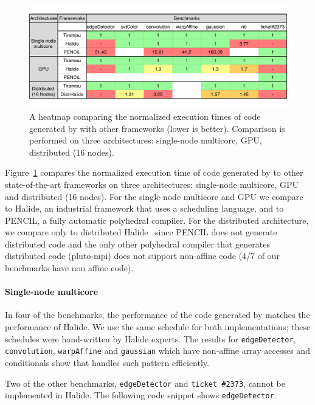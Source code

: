 \begin{figure}[t]
\centering
\includegraphics[width=1.05\columnwidth,trim=50 10 10 10]{./figures/tiramisu_heatmap.pdf}
\vspace{-0.5cm}
\caption{A heatmap comparing the normalized execution times of code generated by \framework{} with other frameworks (lower is better).  Comparison is performed on three architectures: single-node multicore, GPU, distributed (16 nodes).}
\label{fig:speedup}

\end{figure}

Figure~\ref{fig:speedup} compares the normalized execution time of code generated by \framework{} to other state-of-the-art frameworks on three architectures: single-node multicore, GPU and distributed (16 nodes).  For the single-node multicore and GPU we compare \framework{} to Halide, an industrial framework that uses a scheduling language, and to PENCIL, a fully automatic polyhedral compiler.  For the distributed architecture, we compare only to distributed Halide~\cite{denniston2016distributed} since PENCIL does not generate distributed code and the only other polyhedral compiler that generates distributed code (pluto-mpi) does not support non-affine code (4/7 of our benchmarks have non affine code).

\paragraph{Single-node multicore}
In four of the benchmarks, the performance of the code generated by \framework{} matches the performance of Halide.  We use the same schedule for both implementations; these schedules were hand-written by Halide experts.  The results for \texttt{edgeDetector}, \texttt{convolution}, \texttt{warpAffine} and \texttt{gaussian} which have non-affine array accesses and conditionals show that \framework{} handles such pattern efficiently.

Two of the other benchmarks, \texttt{edgeDetector} and \texttt{ticket \#2373}, cannot be implemented in Halide.  The following code snippet shows \texttt{edgeDetector}.

